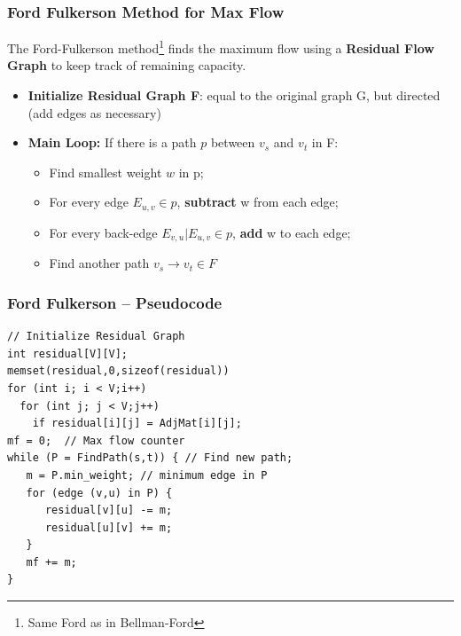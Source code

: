 \begin{frame}[fragile]
  \frametitle{Ford Fulkerson Method for Max Flow}

  \begin{block}{}
    The Ford-Fulkerson method\footnote{Same Ford as in Bellman-Ford} finds the maximum flow using a {\bf Residual Flow Graph} to keep track of remaining capacity.
  \end{block}

  \medskip

  \begin{itemize}
  \item {\bf Initialize Residual Graph F}: equal to the original graph G, but directed (add edges as necessary)\medskip
  \item {\bf Main Loop:} If there is a path $p$ between $v_s$ and $v_t$ in F:
  \begin{itemize}
    \item Find smallest weight $w$ in p;
    \item For every edge $E_{u,v} \in p$, {\bf subtract} w from each edge;
    \item For every back-edge $E_{v,u} | E_{u,v}\in p$, {\bf add} w to each edge;
    \item Find another path $v_s \to v_t \in F$
  \end{itemize}
  \end{itemize}
\end{frame}

\begin{frame}[fragile]
  \frametitle{Ford Fulkerson -- Pseudocode}
  \begin{exampleblock}{}
\begin{verbatim}
// Initialize Residual Graph
int residual[V][V];
memset(residual,0,sizeof(residual))
for (int i; i < V;i++)
  for (int j; j < V;j++)
    if residual[i][j] = AdjMat[i][j];
mf = 0;  // Max flow counter
while (P = FindPath(s,t)) { // Find new path;
   m = P.min_weight; // minimum edge in P
   for (edge (v,u) in P) {
      residual[v][u] -= m;
      residual[u][v] += m;
   }
   mf += m;
}
\end{verbatim}
  \end{exampleblock}
\end{frame}

